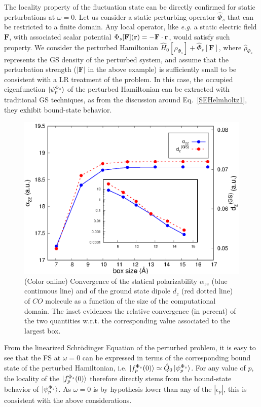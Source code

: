 \documentclass[reprint,aps,prb]{revtex4-1}
\renewcommand{\r}{{\bf r}}
\newcommand{\eps}{\epsilon}
\newcommand{\op}[1]{\hat {#1}}
\newcommand{\dm}{\op{\rho}}
\newcommand{\hnot}{\op{H}_0}
\begin{document}
The locality property of the fluctuation state can be directly confirmed for static perturbations at $\omega=0$.
Let us consider a static perturbing operator $\op\Phi_s$ that can be restricted to a finite domain.
Any local operator, like \emph{e.g.} a static electric field $\mathbf F$, with associated scalar potential $\Phi_s[\mathbf F](\r) = -\mathbf F \cdot \r$, would satisfy such property.
We consider the perturbed Hamiltonian $\hnot[\dm_{\Phi_s}] + \op\Phi_s[\mathbf F]$, where $\dm_{\Phi_s}$ represents the GS density of the perturbed system, and assume that the
perturbation strength ($|\mathbf F|$ in the above example) is sufficiently small to be consistent with a LR treatment of the problem.
In this case, the occupied eigenfunction $\ket{\psi_p^{\Phi_s}}$ of the perturbed Hamiltonian can be extracted with traditional GS techniques,
as from the discussion around Eq.~\eqref{SEHelmholtz1}, they exhibit bound-state behavior.
\begin{figure}[t]
\includegraphics[scale=0.68]{Fig1_CO_statPolvsBox.eps}
\caption{\label{co_alphaStatic}(Color online) Convergence of the statical polarizability $\alpha_{zz}$ (blue continuous line) and of the ground state dipole $d_z$ (red dotted line)
of $CO$ molecule as a function of the size of the computational domain. The inset evidences the relative convergence (in percent) of the two quantities w.r.t. the corresponding value associated to the largest
box.}
\end{figure}

From the linearized Schr\"odinger Equation of the perturbed problem, it is easy to see that the FS at $\omega=0$ can be expressed
in terms of the corresponding bound state of the perturbed Hamiltonian, i.e.
$\ket{f_p^{\Phi_s}(0)} \simeq \op Q_0 \ket{\psi_p^{\Phi_s}}$.
For any value of $p$, the locality of the $\ket{f_p^{\Phi_s}(0)}$ therefore directly stems from the
bound-state behavior of $\ket{\psi_p^{\Phi_s}}$. As $\omega=0$ is by hypothesis
lower than any of the $|\eps_p|$, this is consistent with the above considerations.
\end{document}
